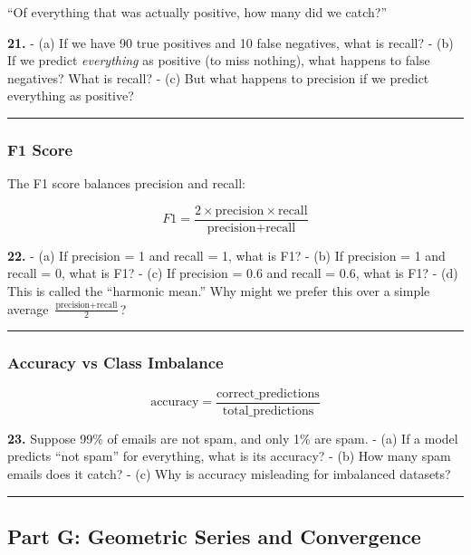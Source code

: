 \documentclass[
  11pt,
]{article}
\begin{document}
``Of everything that was actually positive, how many did we catch?''

\textbf{21.} - (a) If we have 90 true positives and 10 false negatives,
what is recall? - (b) If we predict \emph{everything} as positive (to
miss nothing), what happens to false negatives? What is recall? - (c)
But what happens to precision if we predict everything as positive?

\begin{center}\rule{0.5\linewidth}{0.5pt}\end{center}

\hypertarget{f1-score}{%
\subsubsection{F1 Score}\label{f1-score}}

The F1 score balances precision and recall:

\[F1 = \dfrac{2 \times \text{precision} \times \text{recall}}{\text{precision} + \text{recall}}\]

\textbf{22.} - (a) If precision = 1 and recall = 1, what is F1? - (b) If
precision = 1 and recall = 0, what is F1? - (c) If precision = 0.6 and
recall = 0.6, what is F1? - (d) This is called the ``harmonic mean.''
Why might we prefer this over a simple average
\(\frac{\text{precision} + \text{recall}}{2}\)?

\begin{center}\rule{0.5\linewidth}{0.5pt}\end{center}

\hypertarget{accuracy-vs-class-imbalance}{%
\subsubsection{Accuracy vs Class
Imbalance}\label{accuracy-vs-class-imbalance}}

\[\text{accuracy} = \dfrac{\text{correct\_predictions}}{\text{total\_predictions}}\]

\textbf{23.} Suppose 99\% of emails are not spam, and only 1\% are spam.
- (a) If a model predicts ``not spam'' for everything, what is its
accuracy? - (b) How many spam emails does it catch? - (c) Why is
accuracy misleading for imbalanced datasets?

\begin{center}\rule{0.5\linewidth}{0.5pt}\end{center}

\hypertarget{part-g-geometric-series-and-convergence}{%
\subsection{Part G: Geometric Series and
Convergence}\label{part-g-geometric-series-and-convergence}}
\end{document}
